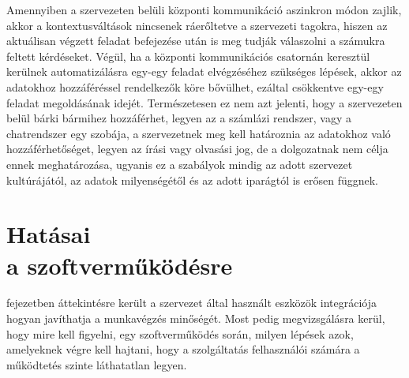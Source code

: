Amennyiben a szervezeten belüli központi kommunikáció aszinkron módon zajlik, akkor a kontextusváltások nincsenek ráerőltetve a szervezeti tagokra, hiszen az aktuálisan végzett feladat befejezése után is meg tudják válaszolni a számukra feltett kérdéseket.
Végül, ha a központi kommunikációs csatornán keresztül kerülnek automatizálásra egy-egy feladat elvégzéséhez szükséges lépések, akkor az adatokhoz hozzáféréssel rendelkezők köre bővülhet, ezáltal csökkentve egy-egy feladat megoldásának idejét.
Természetesen ez nem azt jelenti, hogy a szervezeten belül bárki bármihez hozzáférhet, legyen az a számlázi rendszer, vagy a chatrendszer egy szobája, a szervezetnek meg kell határoznia az adatokhoz való hozzáférhetőséget, legyen az írási vagy olvasási jog, de a dolgozatnak nem célja ennek meghatározása, ugyanis ez a szabályok mindig az adott szervezet kultúrájától, az adatok milyenségétől és az adott iparágtól is erősen függnek.

\section{Hatásai\\a szoftverműködésre}
 fejezetben áttekintésre került a szervezet által használt eszközök integrációja hogyan javíthatja a munkavégzés minőségét. Most pedig megvizsgálásra kerül, hogy mire kell figyelni, egy szoftverműködés során, milyen lépések azok, amelyeknek végre kell hajtani, hogy a szolgáltatás felhasználói számára a működtetés szinte láthatatlan legyen.

